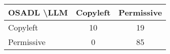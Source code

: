 \begin{tabular}{l|cc}\hline
	\textbf{OSADL \textbackslash LLM} & Copyleft & Permissive\\\hline
	Copyleft & 10 & 19\\
	Permissive & 0 & 85\\\hline
\end{tabular}
